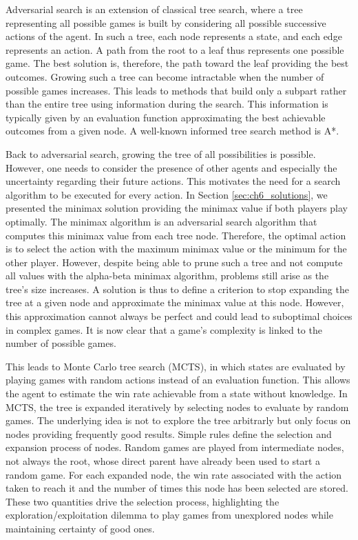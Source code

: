 Adversarial search is an extension of classical tree search, where a tree representing all possible games is built by considering all possible successive actions of the agent.
In such a tree, each node represents a state, and each edge represents an action. 
A path from the root to a leaf thus represents one possible game.
The best solution is, therefore, the path toward the leaf providing the best outcomes.
Growing such a tree can become intractable when the number of possible games increases.
This leads to methods that build only a subpart rather than the entire tree using information during the search.
This information is typically given by an evaluation function approximating the best achievable outcomes from a given node.
A well-known informed tree search method is A*.

Back to adversarial search, growing the tree of all possibilities is possible.
However, one needs to consider the presence of other agents and especially the uncertainty regarding their future actions.
This motivates the need for a search algorithm to be executed for every action.
In Section \ref{sec:ch6_solutions}, we presented the minimax solution providing the minimax value if both players play optimally.
The minimax algorithm is an adversarial search algorithm that computes this minimax value from each tree node.
Therefore, the optimal action is to select the action with the maximum minimax value or the minimum for the other player.
However, despite being able to prune such a tree and not compute all values with the alpha-beta minimax algorithm, problems still arise as the tree's size increases.
A solution is thus to define a criterion to stop expanding the tree at a given node and approximate the minimax value at this node.
However, this approximation cannot always be perfect and could lead to suboptimal choices in complex games.
It is now clear that a game's complexity is linked to the number of possible games.

This leads to Monte Carlo tree search (MCTS), in which states are evaluated by playing games with random actions instead of an evaluation function.
This allows the agent to estimate the win rate achievable from a state without knowledge.
In MCTS, the tree is expanded iteratively by selecting nodes to evaluate by random games.
The underlying idea is not to explore the tree arbitrarly but only focus on nodes providing frequently good results.
Simple rules define the selection and expansion process of nodes.
Random games are played from intermediate nodes, not always the root, whose direct parent have already been used to start a random game.
For each expanded node, the win rate associated with the action taken to reach it and the number of times this node has been selected are stored.
These two quantities drive the selection process, highlighting the exploration/exploitation dilemma to play games from unexplored nodes while maintaining certainty of good ones.

